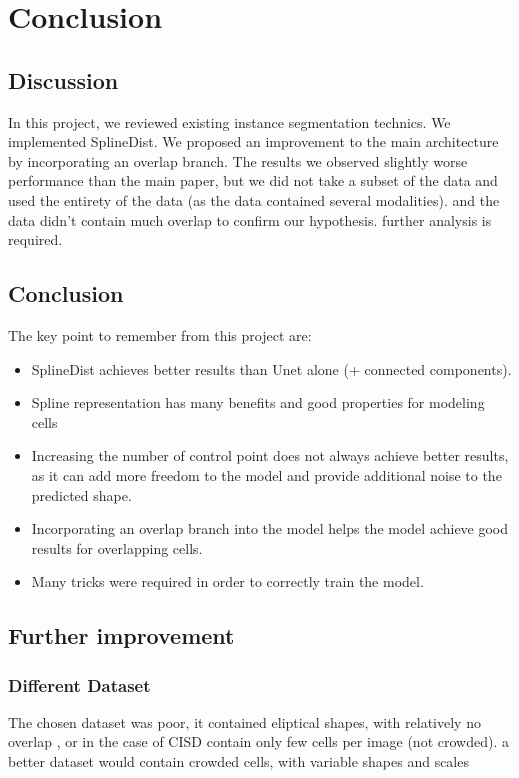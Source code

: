 \documentclass[main.tex]{subfiles}
\begin{document}
\chapter{Conclusion}

\section{Discussion}
In this project, we reviewed existing instance segmentation technics. We implemented SplineDist. We proposed an improvement to the main architecture by incorporating an overlap branch. The results we observed slightly worse performance than the main paper, but we did not take a subset of the data and used the entirety of the data (as the data contained several modalities). and the data didn't contain much overlap to confirm our hypothesis. further analysis is required.



\section{Conclusion}
The key point to remember from this project are: 
\begin{itemize}
    \item SplineDist achieves better results than Unet alone (+ connected components). 
    \item Spline representation has many benefits and good properties for modeling cells
    \item Increasing the number of control point does not always achieve better results, as it can add more freedom to the model and provide additional noise to the predicted shape.
    \item Incorporating an overlap branch into the model helps the model achieve good results for overlapping cells.
    \item Many tricks were required in order to correctly train the model.
    
\end{itemize}

\section{Further improvement}
\subsection{Different Dataset}
The chosen dataset was poor, it contained eliptical shapes, with relatively no overlap , or in the case of CISD contain only few cells per image (not crowded). a better dataset would contain crowded cells, with variable shapes and scales
\end{document}
